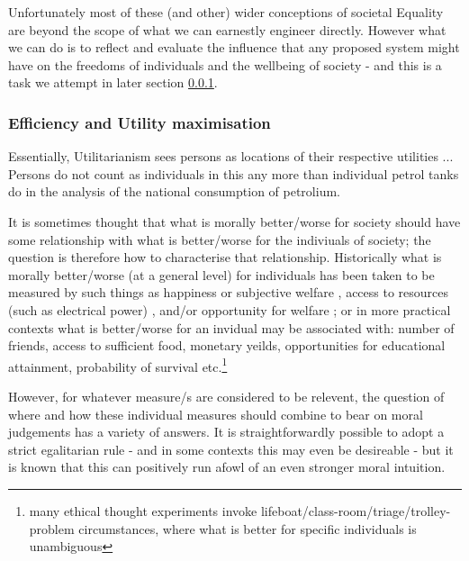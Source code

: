 Unfortunately most of these (and other) wider conceptions of societal Equality are beyond the scope of what we can earnestly engineer directly. However what we can do is to reflect and evaluate the influence that any proposed system might have on the freedoms of individuals and the wellbeing of society - and this is a task we attempt in later section \ref{}.

\subsubsection{Efficiency and Utility maximisation}

\begin{displayquote}
Essentially, Utilitarianism sees persons as locations of their respective utilities %
 ... Persons do not count as individuals in this any more than individual petrol tanks do in the analysis of the national consumption of petrolium.
\cite{}
\end{displayquote}

 
It is sometimes thought that what is morally better/worse for society should have some relationship with what is better/worse for the indiviuals of society; the question is therefore how to characterise that relationship.
Historically what is morally better/worse (at a general level) for individuals has been taken to be measured by such things as happiness \cite{burns2005happiness} or subjective welfare \cite{10.2307/2264894}, access to resources (such as electrical power) \cite{10.2307/2265047}, and/or opportunity for welfare \cite{10.2307/4320203};
or in more practical contexts what is better/worse for an invidual may be associated with: number of friends, access to sufficient food, monetary yeilds, opportunities for educational attainment, probability of survival etc.\footnote{many ethical thought experiments invoke lifeboat/class-room/triage/trolley-problem circumstances, where what is better for specific individuals is unambiguous}

However, for whatever measure/s are considered to be relevent, the question of where and how these individual measures should combine to bear on moral judgements has a variety of answers.
It is straightforwardly possible to adopt a strict egalitarian rule - and in some contexts this may even be desireable - but it is known that this can positively run afowl of an even stronger moral intuition.

\cite{TheoriesofValueAggregation}




